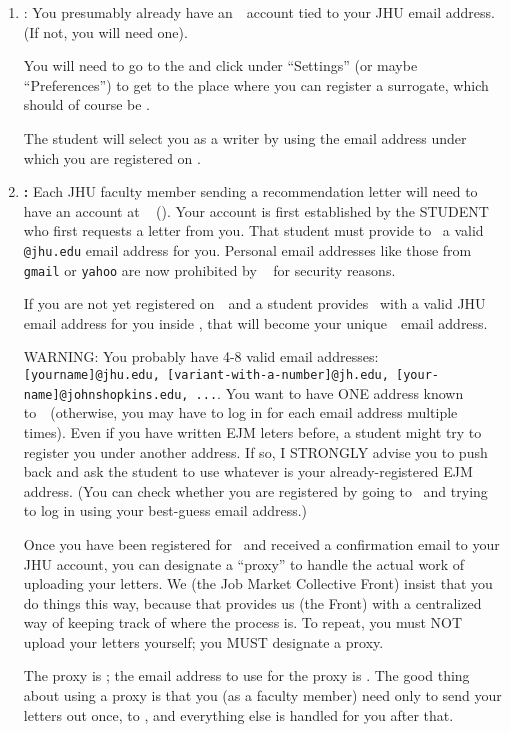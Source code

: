 \documentclass{\classes/econtex}
\begin{document}
\begin{enumerate}

\item \textbf{\AEAref}:
  You presumably already have an~{\AEARecLink}~account tied to your JHU email address.  (If not, you will need one).

  You will need to go to the \AEARecLink and click under ``Settings'' (or maybe ``Preferences'') to get to the place where you can register a surrogate, which should of course be \jmstaffemail.

  The student will select you as a writer by using the email address under which you are registered on \AEALink.
  
  
\item \textbf{\EJM:} Each JHU faculty member sending a recommendation letter will need to have an account at \EJM ~ (\EJMLink). Your account is first established by the STUDENT who first requests a letter from you. That student must provide to \EJM~a valid \texttt{@jhu.edu} email address for you.  Personal email addresses like those from \texttt{gmail} or \texttt{yahoo} are now prohibited by \EJM~ for security reasons. 

  \medskip
  If you are not yet registered on~\EJM~and a student provides \EJM~with a valid JHU email address for you inside \EJM, that will become your unique~\EJM~email address.

  WARNING: You probably have 4-8 valid email addresses: \texttt{[yourname]@jhu.edu, [variant-with-a-number]@jh.edu, [your-name]@johnshopkins.edu, ...}.  You want to have ONE address known to~{\EJM}~(otherwise, you may have to log in for each email address multiple times).  Even if you have written EJM leters before, a student might try to register you under another address.  If so, I STRONGLY advise you to push back and ask the student to use whatever is your already-registered EJM address.  (You can check whether you are registered by going to {\EJM}~and trying to log in using your best-guess email address.)

  Once you have been registered for \EJM~and received a confirmation email to your JHU account, you can designate a ``proxy'' to handle the actual work of uploading your letters.  We (the Job Market Collective Front) insist that you do things this way, because that provides us (the Front) with a centralized way of keeping track of where the process is.  To repeat, you must NOT upload your letters yourself; you MUST designate a proxy.

  The proxy is {\JMStaffName} \JMStaffNameLast; the email address to use for the proxy is
  \jmstaffemail.  The good thing about using a proxy is that you (as a faculty member)
  need only to send your letters out once, to \jmstaffemail, and everything 
  else is handled for you after that. %


\end{enumerate}
\end{document}
